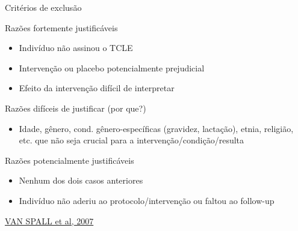 \documentclass{beamer}
\begin{document}
\begin{frame}{Critérios de exclusão}
  \begin{block}{Razões fortemente justificáveis}
    \begin{itemize}
      \footnotesize
    \item Indivíduo não assinou o TCLE
    \item Intervenção ou placebo potencialmente prejudicial
    \item Efeito da intervenção difícil de interpretar
    \end{itemize}
  \end{block}
  \pause
  \begin{block}{Razões difíceis de justificar (por que?)}
    \small
    \begin{itemize}
    \item Idade, gênero, cond. gênero-específicas (gravidez, lactação), etnia, religião, etc. que não seja crucial para a intervenção/condição/resulta
    \end{itemize}
  \end{block}
  \pause
  \begin{block}{Razões potencialmente justificáveis}
    \small
    \begin{itemize}
    \item Nenhum dos dois casos anteriores
    \item Indivíduo não aderiu ao protocolo/intervenção ou faltou ao follow-up
    \end{itemize}
  \end{block}

  \vfill
  \scriptsize
  \hfill \href{https://doi.org/10.1001/jama.297.11.1233}{VAN SPALL et al, 2007}
\end{frame}
\end{document}
